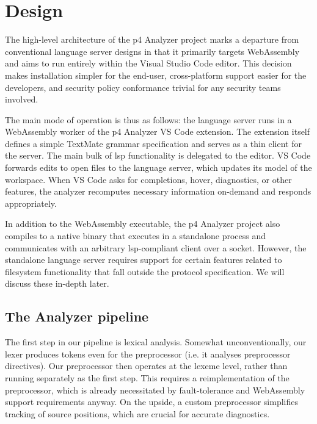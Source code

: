 \chapter{Design}

The high-level architecture of the \acrshort{p4} Analyzer project marks a
departure from conventional language server designs in that it primarily targets
WebAssembly and aims to run entirely within the Visual Studio Code editor. This
decision makes installation simpler for the end-user, cross-platform support
easier for the developers, and security policy conformance trivial for any
security teams involved.

The main mode of operation is thus as follows: the language server runs in a
WebAssembly worker of the \acrshort{p4} Analyzer VS Code extension. The
extension itself defines a simple TextMate\cite{textmate} grammar specification
and serves as a thin client for the server. The main bulk of \acrshort{lsp}
functionality is delegated to the editor. VS Code forwards edits to open files
to the language server, which updates its model of the workspace. When VS Code
asks for completions, hover, diagnostics, or other features, the analyzer
recomputes necessary information on-demand and responds appropriately.

In addition to the WebAssembly executable, the \acrshort{p4} Analyzer project
also compiles to a native binary that executes in a standalone process and
communicates with an arbitrary \acrshort{lsp}-compliant client over a socket.
However, the standalone language server requires support for certain features
related to filesystem functionality that fall outside the protocol
specification. We will discuss these in-depth later.

\section{The  Analyzer pipeline}

The first step in our pipeline is lexical analysis. Somewhat unconventionally,
our lexer produces tokens even for the preprocessor (i.e. it analyses
preprocessor directives). Our preprocessor then operates at the lexeme level,
rather than running separately as the first step. This requires a
reimplementation of the preprocessor, which is already necessitated by
fault-tolerance and WebAssembly support requirements anyway. On the upside, a
custom preprocessor simplifies tracking of source positions, which are crucial
for accurate diagnostics.

